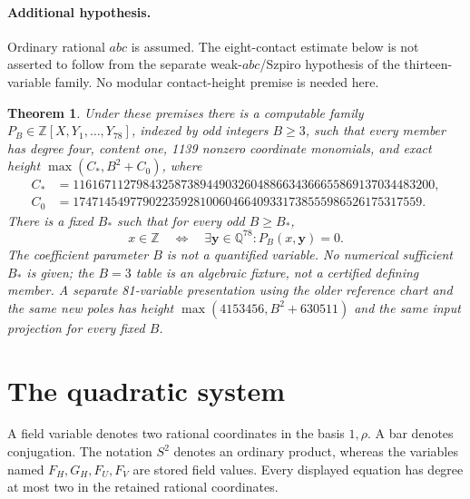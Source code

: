 \documentclass[11pt,a4paper]{article}
\newtheorem{theorem}{Theorem}[section]\newtheorem{lemma}[theorem]{Lemma}\newtheorem{proposition}[theorem]{Proposition}
\newcommand{\Q}{\mathbb Q}\newcommand{\Z}{\mathbb Z}\DeclareMathOperator{\Tr}{Tr}\DeclareMathOperator{\Nm}{Nm}\DeclareMathOperator{\rad}{rad}
\begin{document}
\paragraph{Additional hypothesis.}
Ordinary rational $abc$ is assumed. The eight-contact estimate below
is not asserted to follow from the separate weak-$abc$/Szpiro
hypothesis of the thirteen-variable family. No modular contact-height
premise is needed here.

\begin{theorem}\label{thm:main}
Under these premises there is a computable family
$P_B\in\Z[X,Y_1,\ldots,Y_{78}]$, indexed by odd integers $B\ge3$,
such that every member has degree four, content one, 1139 nonzero
coordinate monomials, and exact height $\max(C_*,B^2+C_0)$, where
\begin{align*}
 C_*&=116167112798432587389449032604886634366655869137034483200,\\
 C_0&=1747145497790223592810060466409331738555986526175317559.
\end{align*}
There is a fixed $B_*$ such that for every odd $B\ge B_*$,
\[
 x\in\Z\quad\Longleftrightarrow\quad
 \exists\boldsymbol y\in\Q^{78}:P_B(x,\boldsymbol y)=0.
\]
The coefficient parameter $B$ is not a quantified variable. No numerical
sufficient $B_*$ is given; the $B=3$ table is an algebraic fixture,
not a certified defining member. A separate 81-variable presentation
using the older reference chart and the same new poles has height
$\max(4153456,B^2+630511)$ and the same input projection for every
fixed $B$.
\end{theorem}

\section{The quadratic system}
A field variable denotes two rational coordinates in the basis
$1,\rho$. A bar denotes conjugation. The notation $S^2$ denotes
an ordinary product, whereas the variables named $F_H,G_H,F_U,F_V$
are stored field values. Every displayed equation has degree at most
two in the retained rational coordinates.
\end{document}
